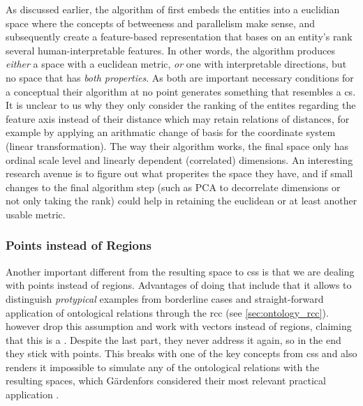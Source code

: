 As discussed earlier, the algorithm of \textcite{Derrac2015} first embeds the entities into a euclidian space where the concepts of betweeness and parallelism make sense, and subsequently create a feature-based representation that bases on an entity's rank \wrt several human-interpretable features. In other words, the algorithm produces \textit{either} a space with a euclidean metric, \textit{or} one with interpretable directions, but no space that has \textit{both properties}. As both are important necessary conditions for a conceptual their algorithm at no point generates something that resembles a \gls{cs}. It is unclear to us why they only consider the ranking of the entites regarding the feature axis instead of their distance which may retain relations of distances, for example by applying an arithmatic change of basis for the coordinate system (linear transformation). The way their algorithm works, the final space only has ordinal scale level and linearly dependent (correlated) dimensions. An interesting research avenue is to figure out what properites the space they have, and if small changes to the final algorithm step (such as PCA to decorrelate dimensions or not only taking the rank) could help in retaining the euclidean or at least another usable metric.


\subsubsection*{Points instead of Regions}

Another important different from the resulting space to \glspl{cs} is that we are dealing with points instead of regions. Advantages of doing that include that it allows to distinguish \textit{protypical} examples from borderline cases \cite{Gardenfors2000a} and straight-forward application of ontological relations through the \gls{rcc} (see \autoref{sec:ontology_rcc}). 
\textcite{Derrac2015} however drop this assumption and work with vectors instead of regions, claiming that this is a  \cite[8]{Derrac2015}. Despite the last part, they never address it again, so in the end they stick with points. This breaks with one of the key concepts from \glspl{cs} and also renders it impossible to simulate any of the ontological relations with the resulting spaces, which Gärdenfors considered their most relevant practical application \cite{Gardenfors2004}. 

